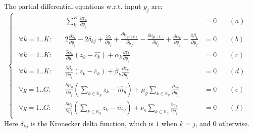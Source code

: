 \documentclass[11 pt]{article}
\begin{document}
The partial differential equations w.r.t. input $y_j$ are:
\begin{equation}\label{eqns_nested_wrt_y_j}
    \begin{cases}
        \begin{aligned}
            & \sum_k^K \frac{\partial z_k}{\partial y_j} & = 0 &\quad (a)\\
            
            \forall k=1..K : \quad & 2\frac{\partial z_i}{\partial y_j} - 2\delta_{kj} + \frac{\partial \lambda}{\partial y_j} + \frac{\partial \mu_{gr(k)}}{\partial y_j} - \frac{\partial \nu_{gr(k)}}{\partial y_j} + \frac{\partial \alpha_k}{\partial y_j} - \frac{\partial \beta_k}{\partial y_j} & = 0 &\quad (b)\\
            
            \forall k=1..K : \quad & \frac{\partial \alpha_k}{\partial y_j}(z_k - \hat{c_k}) + \alpha_k \frac{\partial z_k}{\partial y_j} & = 0 &\quad (c)\\
            
            \forall k=1..K : \quad & \frac{\partial \beta_k}{\partial y_j}(z_k - \check{c_k}) + \beta_k \frac{\partial z_k}{\partial y_j}& = 0 &\quad (d) \\

            \forall g=1..G : \quad & \frac{\partial \mu_g}{\partial y_j}(\sum_{k \in \mathbb{K}_g} z_{k} - \hat{m_{g}}) + \mu_g \sum_{k \in \mathbb{K}_g} \frac{\partial z_k}{\partial y_j}& = 0 &\quad (e) \\

            \forall g=1..G : \quad & \frac{\partial \nu_g}{\partial y_j}(\sum_{k \in \mathbb{K}_g} z_{k} - \check{m_{g}}) + \nu_g \sum_{k \in \mathbb{K}_g} \frac{\partial z_k}{\partial y_j}& = 0 &\quad (f)
        \end{aligned}
    \end{cases}
\end{equation}
Here $\delta_{kj}$ is the Kronecker delta function, which is $1$ when $k=j$, and $0$ otherwise.
\end{document}
